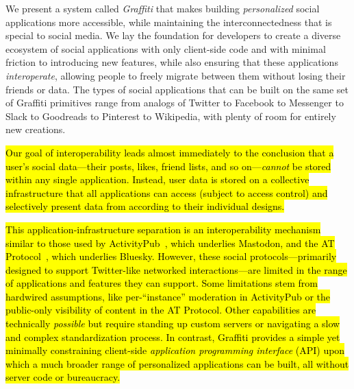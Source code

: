 We present a system called \emph{Graffiti} that makes
building \emph{personalized} social applications
more accessible,
while maintaining the interconnectedness that is special to social media.
We lay the foundation for developers to create a diverse ecosystem
of social applications
with only client-side code and with minimal friction
to introducing new features,
while also ensuring that these applications \emph{interoperate},
allowing people to freely migrate between them without
losing their friends or data.
The types of social applications that can be built on the same set of Graffiti primitives range from analogs of Twitter to Facebook to Messenger to Slack to Goodreads to Pinterest to Wikipedia,
with plenty of room for entirely new creations.


\hl{%
Our goal of interoperability leads almost immediately
to the conclusion that a user's
social data---their posts, likes, friend lists, and so on---\emph{cannot}
be stored within any single application.
Instead, user data is stored on a collective infrastructure
that all applications can access (subject to access control)
and selectively present data from according to their individual designs.
}%

\hl{%
This application-infrastructure separation
is an interoperability mechanism similar to
those used by
ActivityPub~{\cite{activitypub}},
which underlies Mastodon,
and the AT Protocol~{\cite{bluesky}}, which underlies Bluesky.
However, these social protocols---primarily designed to support
Twitter-like networked interactions---are limited in the range of applications
and features they can support.
Some limitations stem from hardwired assumptions,
like per-``instance'' moderation in ActivityPub
or the public-only visibility of content in the AT Protocol.
Other capabilities are technically \emph{possible}
but require standing up custom servers or navigating
a slow and complex standardization process.
In contrast, Graffiti provides a simple yet minimally constraining
client-side \emph{application programming interface} (API)
upon which a much broader range of personalized applications can be built, all
without server code or bureaucracy.
}%


